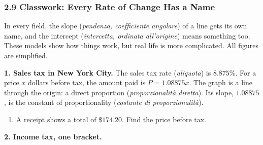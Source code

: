 \documentclass[12pt, twoside]{article}
\newcommand{\ita}[1]{(\emph{#1})}
\begin{document}
\subsubsection*{2.9 Classwork: Every Rate of Change Has a Name}

In every field, the slope \ita{pendenza, coefficiente angolare} of a line
gets its own name, and the intercept \ita{intercetta, ordinata
all'origine} means something too. These models show how things work, but
real life is more complicated. All figures are simplified.

\textbf{1. Sales tax in New York City.} The sales tax rate \ita{aliquota}
is $8.875\%$. For a price $x$ dollars before tax, the amount paid is
$P = 1.08875x$. The graph is a line through the origin: a direct
proportion \ita{proporzionalità diretta}. Its slope, $1.08875$, is the
constant of proportionality \ita{costante di proporzionalità}.

\begin{enumerate}[label=(\alph*), itemsep=0.1cm]
  \item A receipt shows a total of $\$174.20$. Find the price before tax.
  \vspace{1.4cm}
\end{enumerate}

\textbf{2. Income tax, one bracket.}
\end{document}
